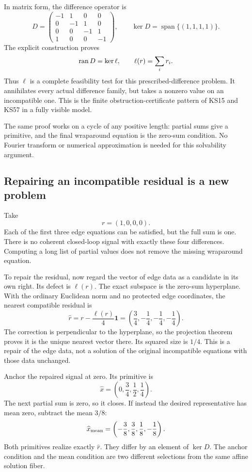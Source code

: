 In matrix form, the difference operator is
\[
 D=\begin{pmatrix}
 -1&1&0&0\\
 0&-1&1&0\\
 0&0&-1&1\\
 1&0&0&-1
 \end{pmatrix},\qquad
 \ker D=\operatorname{span}\{(1,1,1,1)\}.
\]
The explicit construction proves
\[
 \operatorname{ran} D=\ker\ell,\qquad \ell(r)=\sum_i r_i.
\]
Thus \(\ell\) is a complete feasibility test for this prescribed-difference problem. It annihilates every actual difference family, but takes a nonzero value on an incompatible one. This is the finite obstruction-certificate pattern of KS15 and KS57 in a fully visible model.

The same proof works on a cycle of any positive length: partial sums give a primitive, and the final wraparound equation is the zero-sum condition. No Fourier transform or numerical approximation is needed for this solvability argument.

\subsection{Repairing an incompatible residual is a new problem}
Take
\[
 r=(1,0,0,0).
\]
Each of the first three edge equations can be satisfied, but the full sum is one. There is no coherent closed-loop signal with exactly these four differences. Computing a long list of partial values does not remove the missing wraparound equation.

To repair the residual, now regard the vector of edge data as a candidate in its own right. Its defect is \(\ell(r)\). The exact subspace is the zero-sum hyperplane. With the ordinary Euclidean norm and no protected edge coordinates, the nearest compatible residual is
\[
 \widehat r=r-\frac{\ell(r)}4\mathbf1
 =\left(\frac34,-\frac14,-\frac14,-\frac14\right).
\]
The correction is perpendicular to the hyperplane, so the projection theorem proves it is the unique nearest vector there. Its squared size is \(1/4\). This is a repair of the edge data, not a solution of the original incompatible equations with those data unchanged.

Anchor the repaired signal at zero. Its primitive is
\begin{equation}\label{eq:cycle-anchor-primitive}
 \widehat x=\left(0,\frac34,\frac12,\frac14\right).
\end{equation}
The next partial sum is zero, so it closes. If instead the desired representative has mean zero, subtract the mean \(3/8\):
\[
 \widehat x_{\rm mean}
 =\left(-\frac38,\frac38,\frac18,-\frac18\right).
\]
Both primitives realize exactly \(\widehat r\). They differ by an element of \(\ker D\). The anchor condition and the mean condition are two different selections from the same affine solution fiber.

